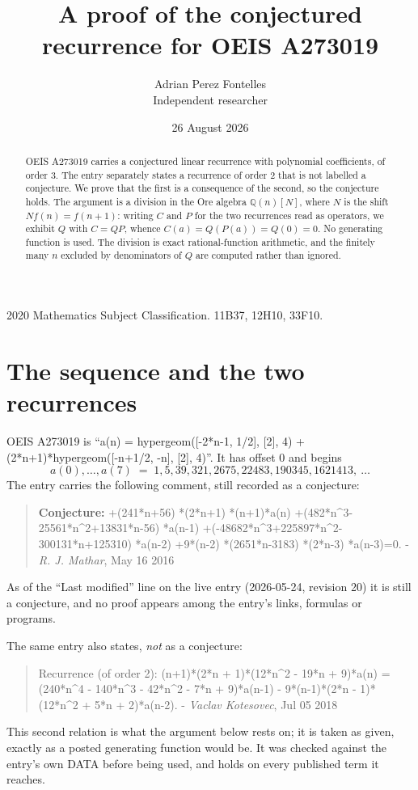 \documentclass[11pt,a4paper]{article}
\title{A proof of the conjectured recurrence for OEIS A273019}
\author{Adrian Perez Fontelles\\ \small Independent researcher}
\date{26 August 2026}
\theoremstyle{plain}
\theoremstyle{definition}
\begin{document}
\maketitle

\begin{abstract}
OEIS A273019 carries a conjectured linear recurrence with polynomial coefficients, of
order 3. The entry separately states a recurrence of order 2 that is not
labelled a conjecture. We prove that the first is a consequence of the second, so the
conjecture holds. The argument is a division in the Ore algebra
$\mathbb{Q}(n)[N]$, where $N$ is the shift $Nf(n)=f(n+1)$: writing $C$ and $P$ for the two
recurrences read as operators, we exhibit $Q$ with $C=QP$, whence
$C(a)=Q(P(a))=Q(0)=0$. No generating function is used. The division is exact
rational-function arithmetic, and the finitely many $n$ excluded by denominators of $Q$
are computed rather than ignored.
\end{abstract}

\noindent\small 2020 Mathematics Subject Classification. 11B37, 12H10, 33F10.\normalsize

\section{The sequence and the two recurrences}

OEIS A273019 is ``a(n) = hypergeom([-2*n-1, 1/2], [2], 4) + (2*n+1)*hypergeom([-n+1/2, -n], [2], 4)''. It has offset $0$ and begins
\[
a(0),\dots,a(7)\;=\;1, 5, 39, 321, 2675, 22483, 190345, 1621413,\ \dots
\]
The entry carries the following comment, still recorded as a conjecture:
\begin{quote}\small
\textbf{Conjecture:} +(241*n+56) *(2*n+1) *(n+1)*a(n) +(482*n\^{}3-25561*n\^{}2+13831*n-56) *a(n-1) +(-48682*n\^{}3+225897*n\^{}2-300131*n+125310) *a(n-2) +9*(n-2) *(2651*n-3183) *(2*n-3) *a(n-3)=0. - \emph{R. J. Mathar}, May 16 2016
\end{quote}
As of the ``Last modified'' line on the live entry (2026-05-24, revision 20) it is still
a conjecture, and no proof appears among the entry's links, formulas or programs.

The same entry also states, \emph{not} as a conjecture:
\begin{quote}\small
Recurrence (of order 2): (n+1)*(2*n + 1)*(12*n\^{}2 - 19*n + 9)*a(n) = (240*n\^{}4 - 140*n\^{}3 - 42*n\^{}2 - 7*n + 9)*a(n-1) - 9*(n-1)*(2*n - 1)*(12*n\^{}2 + 5*n + 2)*a(n-2). - \emph{Vaclav Kotesovec}, Jul 05 2018
\end{quote}
This second relation is what the argument below rests on; it is taken as given, exactly as
a posted generating function would be. It was checked against the entry's own DATA before
being used, and holds on every published term it reaches.
\end{document}
